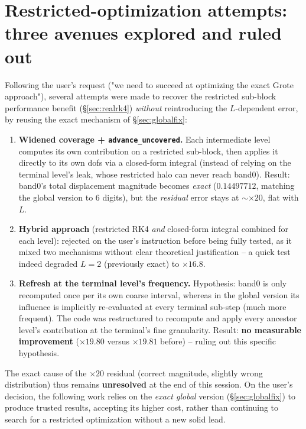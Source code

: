 \documentclass[11pt]{article}
\newcommand{\code}[1]{\texttt{#1}}
\begin{document}
\section{Restricted-optimization attempts: three avenues explored and ruled out}
\label{sec:restrictedattempts}

Following the user's request ("we need to succeed at optimizing the
exact Grote approach"), several attempts were made to recover the
restricted sub-block performance benefit (\S\ref{sec:realrk4})
\emph{without} reintroducing the $L$-dependent error, by reusing the
exact mechanism of \S\ref{sec:globalfix}:

\begin{enumerate}
  \item \textbf{Widened coverage + \code{advance\_uncovered}.} Each
  intermediate level computes its own contribution on a restricted
  sub-block, then applies it directly to its own dofs via a closed-form
  integral (instead of relying on the terminal level's leak, whose
  restricted halo can never reach band0). Result: band0's total
  displacement magnitude becomes \emph{exact} ($0.14497712$, matching
  the global version to 6 digits), but the \emph{residual} error stays
  at $\sim\times20$, flat with $L$.
  \item \textbf{Hybrid approach} (restricted RK4 \emph{and} closed-form
  integral combined for each level): rejected on the user's instruction
  before being fully tested, as it mixed two mechanisms without clear
  theoretical justification -- a quick test indeed degraded $L=2$
  (previously exact) to $\times16.8$.
  \item \textbf{Refresh at the terminal level's frequency.} Hypothesis:
  band0 is only recomputed once per its own coarse interval, whereas in
  the global version its influence is implicitly re-evaluated at every
  terminal sub-step (much more frequent). The code was restructured to
  recompute and apply every ancestor level's contribution at the
  terminal's fine granularity. Result: \textbf{no measurable
  improvement} ($\times19.80$ versus $\times19.81$ before) -- ruling
  out this specific hypothesis.
\end{enumerate}

The exact cause of the $\times20$ residual (correct magnitude, slightly
wrong distribution) thus remains \textbf{unresolved} at the end of this
session. On the user's decision, the following work relies on the
\emph{exact global} version (\S\ref{sec:globalfix}) to produce trusted
results, accepting its higher cost, rather than continuing to search
for a restricted optimization without a new solid lead.
\end{document}
